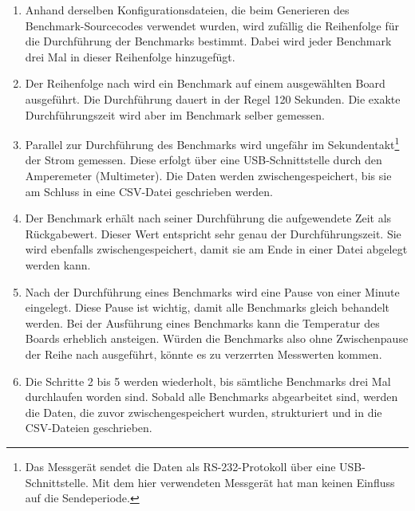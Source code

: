 \begin{enumerate}
\item Anhand derselben Konfigurationsdateien, die beim Generieren des Benchmark-Sourceco\-des verwendet wurden, wird zufällig die Reihenfolge für die Durchführung der Benchmarks bestimmt. Dabei wird jeder Benchmark drei Mal in dieser Reihenfolge hinzugefügt.
\item Der Reihenfolge nach wird ein Benchmark auf einem ausgewählten Board ausgeführt. Die Durchführung dauert in der Regel 120 Sekunden. Die exakte Durchführungszeit wird aber im Benchmark selber gemessen.
\item Parallel zur Durchführung des Benchmarks wird ungefähr im Sekundentakt\footnote{Das Messgerät sendet die Daten als RS-232-Protokoll über eine USB-Schnittstelle. Mit dem hier verwendeten Messgerät hat man keinen Einfluss auf die Sendeperiode.} der Strom gemessen. Diese erfolgt über eine USB-Schnittstelle durch den Amperemeter (Multimeter). Die Daten werden zwischengespeichert, bis sie am Schluss in eine CSV-Datei geschrieben werden.
\item Der Benchmark erhält nach seiner Durchführung die aufgewendete Zeit als Rückgabewert. Dieser Wert entspricht sehr genau der Durchführungszeit. Sie wird ebenfalls zwischengespeichert, damit sie am Ende in einer Datei abgelegt werden kann.
\item Nach der Durchführung eines Benchmarks wird eine Pause von einer Minute eingelegt. Diese Pause ist wichtig, damit alle Benchmarks gleich behandelt werden. Bei der Ausführung eines Benchmarks kann die Temperatur des Boards erheblich ansteigen. Würden die Benchmarks also ohne Zwischenpause der Reihe nach ausgeführt, könnte es zu verzerrten Messwerten kommen.
\item Die Schritte 2 bis 5 werden wiederholt, bis sämtliche Benchmarks drei Mal durchlaufen worden sind. Sobald alle Benchmarks abgearbeitet sind, werden die Daten, die zuvor zwischengespeichert wurden, strukturiert und in die CSV-Dateien geschrieben.
\end{enumerate}